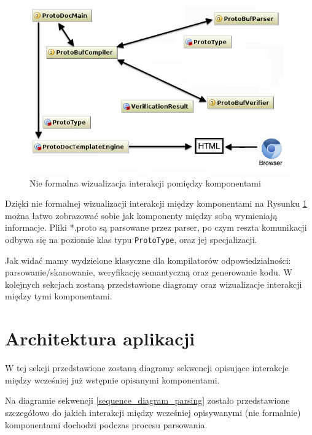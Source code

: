 \documentclass[pdflatex,11pt]{aghdpl}
\begin{document}
\begin{figure}[ch!]
\begin{center}
 \includegraphics[scale=0.85]{main_classes.png}
\end{center}
\label{simple_visualization}
\caption{Nie formalna wizualizacja interakcji pomiędzy komponentami}
\end{figure}

Dzięki nie formalnej wizualizacji interakcji między komponentami na Rysunku \ref{simple_visualization} można łatwo zobrazować sobie
jak komponenty między sobą wymieniają informacje. Pliki *.proto są parsowane przez parser, po czym reszta komunikacji odbywa się na poziomie 
klas typu \verb|ProtoType|, oraz jej specjalizacji.

Jak widać mamy wydzielone klasyczne dla kompilatorów odpowiedzialności: parsowanie/skanowanie, weryfikację semantyczną oraz generowanie kodu.
W kolejnych sekcjach zostaną przedstawione diagramy oraz wizualizacje interakcji między tymi komponentami.

\newpage
\section{Architektura aplikacji}
\label{sec:sequence_diagrams}

W tej sekcji przedstawione zostaną diagramy sekwencji opisujące interakcje między wcześniej już wstępnie opisanymi komponentami.



Na diagramie sekwencji  \ref{sequence_diagram_parsing} zostało przedstawione szczegółowo do jakich interakcji między wcześniej opisywanymi (nie formalnie)
komponentami dochodzi podczas procesu parsowania. 
\end{document}
